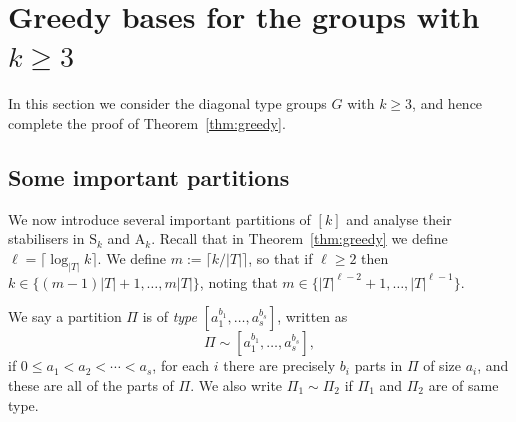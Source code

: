 \documentclass[twoside,a4paper,reqno,11pt]{amsart}
\newcommand{\<}{\langle}
\renewcommand{\>}{\rangle}
\newcommand{\leqs}{\leqslant}
\newcommand{\geqs}{\geqslant}
\def\ge{\geqs}
\def\le{\leqs}
\newcommand{\Sn}{\mathrm{S}}
\newcommand{\An}{\mathrm{A}}
\theoremstyle{definition}
\begin{document}
\section{Greedy bases for the groups with $k \geqs 3$}\label{sec:k_ge_3}

In this section we consider the diagonal type groups $G$ with $k \geqs 3$, %
and hence complete the proof of Theorem~\ref{thm:greedy}.



\subsection{Some important partitions}\label{subsec:partitions}


We now introduce several important partitions of $[k]$ and analyse their stabilisers in $\Sn_k$ and $\An_k$. Recall that in Theorem~\ref{thm:greedy} we define $\ell = \lceil \log_{|T|} k \rceil$. We define $m:= \lceil k/|T| \rceil$, so that if $\ell \ge 2$ then $k \in \{(m-1)|T| + 1, \ldots, m|T|\}$, noting that $m \in \{|T|^{\ell-2} + 1, \ldots, |T|^{\ell-1}\}$. 

We say a partition $\Pi$ is of \textit{type} $[a_1^{b_1},\dots,a_s^{b_s}]$, written as 
\begin{equation*}
\Pi\sim [a_1^{b_1},\dots,a_s^{b_s}],
\end{equation*}
if  $0 \le a_1 < a_2 < \cdots < a_s$, for each $i$ there are precisely $b_i$ parts in $\Pi$ of size $a_i$, 
and these are all of the parts of $\Pi$. We also write $\Pi_1\sim\Pi_2$ if $\Pi_1$ and $\Pi_2$ are of same type.
\end{document}
